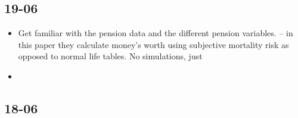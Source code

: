 \documentclass[12pt]{article}
\begin{document}
\subsection{\textbf{19-06}}
\begin{itemize}
      \item Get familiar with the pension data and the different pension
            variables. \cite{odea_sturrock_rest_2023} -- in this paper they
            calculate money's worth using subjective mortality risk as opposed
            to normal life tables. No simulations, just
      \item
\end{itemize}


\subsection{\textbf{18-06}}
\end{document}
